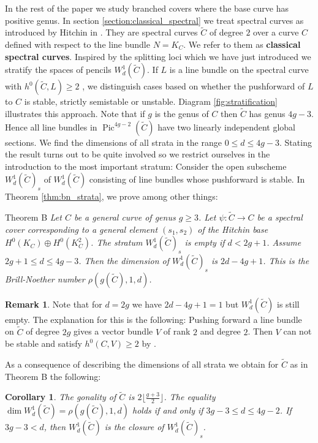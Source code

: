 \documentclass[12pt]{extarticle}
\newtheorem{corollary}[theorem]{Corollary}
\theoremstyle{definition}
\newtheorem{remark}[theorem]{Remark}
\numberwithin{theorem}{section}
\newcommand{\thistheoremname}{}
\newtheorem*{genericthm*}{\thistheoremname}
\newenvironment{namedthm*}[1]
{\renewcommand{\thistheoremname}{#1}%
	\begin{genericthm*}}
	{\end{genericthm*}}
\newcommand{\op}{\operatorname}
\renewcommand{\tilde}{\widetilde}		%
\begin{document}
In the rest of the paper we study branched covers where the base curve has positive genus. In section \ref{section:classical_spectral} we treat spectral curves as introduced by Hitchin in \cite{Hitchin}. They are spectral curves $\tilde{C}$ of degree $2$ over a curve $C$ defined with respect to the line bundle $N = K_C$. We refer to them as \textbf{classical spectral curves}. Inspired by the splitting loci which we have just introduced we stratify the spaces of pencils $W^1_d(\tilde{C})$. If $L$ is a line bundle on the spectral curve with $h^0(\tilde{C},L) \geq 2$ , we distinguish cases based on whether the pushforward of $L$ to $C$ is stable, strictly semistable or unstable. Diagram \ref{fig:stratification} illustrates this approach. 
Note that if $g$ is the genus of $C$ then $\tilde{C}$ has genus $4g-3$. Hence all line bundles in $\op{Pic}^{4g-2}(\tilde{C})$ have two linearly independent global sections. We find the dimensions of all strata in the range $0 \leq d \leq 4g-3$. Stating the result turns out to be quite involved so we restrict ourselves in the introduction to the most important stratum: Consider the open subscheme $W^1_d(\tilde{C})_s$ of $W^1_d(\tilde{C})$ consisting of line bundles whose pushforward is stable. In Theorem \ref{thm:bn_strata}, we prove among other things:
\begin{namedthm*}{Theorem B}
\emph{
Let $C$ be a general curve of genus $g\geq 3$. Let $\psi: \tilde{C} \to C$ be a spectral cover corresponding to a general element $(s_1,s_2)$ of the Hitchin base $H^0(K_C)\oplus H^0(K_C^2)$.
The stratum $W^1_d(\tilde{C})_s$ is empty if $d < 2g+1$. Assume $2g+1 \leq d \leq 4g-3$. Then the dimension of $W^1_d(\tilde{C})_s$ is $2d - 4g +1$. This is the Brill-Noether number $\rho(g(\tilde{C}),1,d)$.}
\end{namedthm*}
\begin{remark}
	Note that for $d = 2g$ we have $2d -4g +1 = 1$ but $W^1_d(\tilde{C})$ is still empty. The explanation for this is the following: Pushing forward a line bundle on $\tilde{C}$ of degree $2g$ gives a vector bundle $V$ of rank $2$ and degree $2$. Then $V$ can not be stable and satisfy $h^0(C,V)\geq 2$ by \cite{Teixidor}.
\end{remark} 
As a consequence of describing the dimensions of all strata we obtain for $\tilde{C}$ as in Theorem B the following:
\begin{corollary}
The gonality of $\tilde{C}$ is $2\lfloor\frac{g+3}{2}\rfloor$. The equality $\dim W^1_d(\tilde{C}) = \rho(g(\tilde{C}),1,d)$ holds if and only if $3g-3 \leq d \leq 4g-2$. If $3g-3 < d $, then $W^1_d(\tilde{C})$ is the closure of $W^1_d(\tilde{C})_s$. 
\end{corollary}
\end{document}
